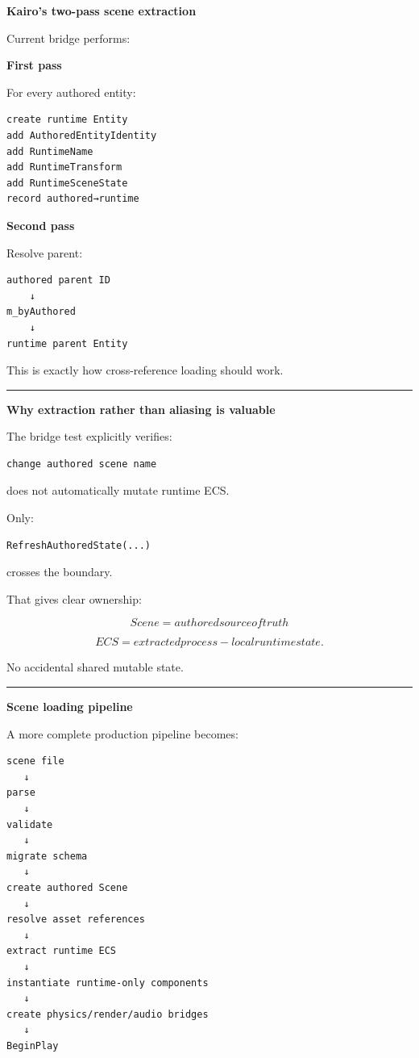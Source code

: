 \textbf{Kairo's two-pass scene extraction}

Current bridge performs:

\textbf{First pass}

For every authored entity:

\begin{verbatim}
create runtime Entity
add AuthoredEntityIdentity
add RuntimeName
add RuntimeTransform
add RuntimeSceneState
record authored→runtime
\end{verbatim}

\textbf{Second pass}

Resolve parent:

\begin{verbatim}
authored parent ID
    ↓
m_byAuthored
    ↓
runtime parent Entity
\end{verbatim}

This is exactly how cross-reference loading should work.

\begin{center}\rule{0.5\linewidth}{0.5pt}\end{center}

\textbf{Why extraction rather than aliasing is valuable}

The bridge test explicitly verifies:

\begin{verbatim}
change authored scene name
\end{verbatim}

does not automatically mutate runtime ECS.

Only:

\begin{verbatim}
RefreshAuthoredState(...)
\end{verbatim}

crosses the boundary.

That gives clear ownership:

\[
\boxed{
Scene = authored source of truth
}
\]

\[
\boxed{
ECS = extracted process-local runtime state.
}
\]

No accidental shared mutable state.

\begin{center}\rule{0.5\linewidth}{0.5pt}\end{center}

\textbf{Scene loading pipeline}

A more complete production pipeline becomes:

\begin{verbatim}
scene file
   ↓
parse
   ↓
validate
   ↓
migrate schema
   ↓
create authored Scene
   ↓
resolve asset references
   ↓
extract runtime ECS
   ↓
instantiate runtime-only components
   ↓
create physics/render/audio bridges
   ↓
BeginPlay
\end{verbatim}

